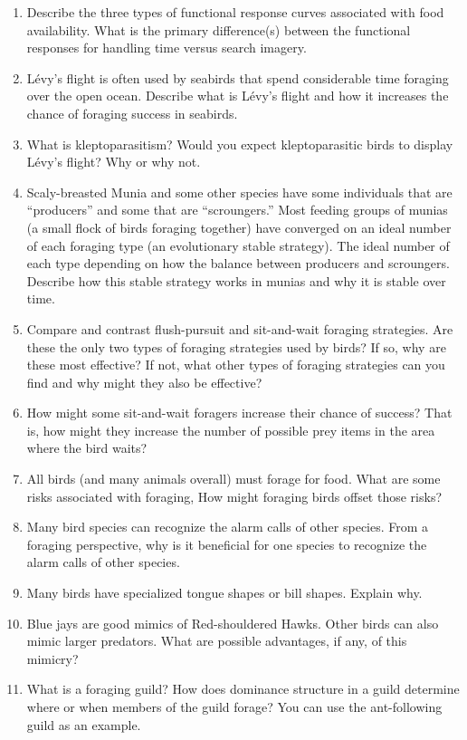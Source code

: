 \documentclass[nofonts, letterpaper]{tufte-handout}
\begin{document}
\begin{enumerate}

\item Describe the three types of functional response curves associated with food availability. What is the primary difference(s) between the functional responses for handling time versus search imagery.

\item Lévy's flight is often used by seabirds that spend considerable time foraging over the open ocean. Describe what is Lévy's flight and how it increases the chance of foraging success in seabirds.

\item What is kleptoparasitism? Would you expect kleptoparasitic birds to display Lévy's flight? Why or why not.

\item Scaly-breasted Munia and some other species have some individuals that are “producers” and some that are “scroungers.” Most feeding groups of munias (a small flock of birds foraging together) have converged on an ideal number of each foraging type (an evolutionary stable strategy). The ideal number of each type depending on how the balance between producers and scroungers. Describe how this stable strategy works in munias and why it is stable over time.

\item Compare and contrast flush-pursuit and sit-and-wait foraging strategies. Are these the only two types of foraging strategies used by birds? If so, why are these most effective? If not, what other types of foraging strategies can you find and why might they also be effective?

\item How might some sit-and-wait foragers increase their chance of success? That is, how might they increase the number of possible prey items in the area where the bird waits?

\item All birds (and many animals overall) must forage for food. What are some risks associated with foraging, How might foraging birds offset those risks?

\item Many bird species can recognize the alarm calls of other species. From a foraging perspective, why is it beneficial for one species to recognize the alarm calls of other species.

\item Many birds have specialized tongue shapes or bill shapes. Explain why.

\item Blue jays are good mimics of Red-shouldered Hawks. Other birds can also mimic larger predators. What are possible advantages, if any, of this mimicry?

\item What is a foraging guild? How does dominance structure in a guild determine where or when members of the guild forage? You can use the ant-following guild as an example.






\end{enumerate}
\end{document}
